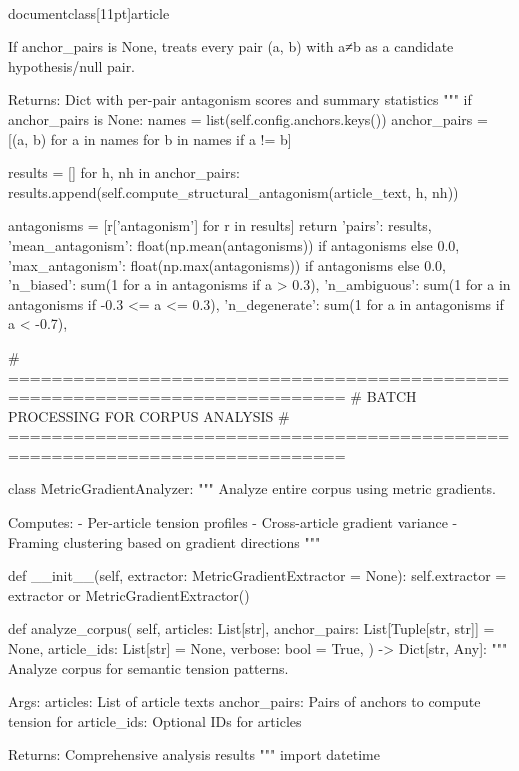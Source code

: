 \\documentclass[11pt]{article}
\begin{document}
\begin{CodeBlock}
        If anchor_pairs is None, treats every pair (a, b) with a≠b as
        a candidate hypothesis/null pair.

        Returns:
            Dict with per-pair antagonism scores and summary statistics
        """
        if anchor_pairs is None:
            names = list(self.config.anchors.keys())
            anchor_pairs = [(a, b) for a in names for b in names if a != b]

        results = []
        for h, nh in anchor_pairs:
            results.append(self.compute_structural_antagonism(article_text, h, nh))

        antagonisms = [r['antagonism'] for r in results]
        return {
            'pairs': results,
            'mean_antagonism': float(np.mean(antagonisms)) if antagonisms else 0.0,
            'max_antagonism': float(np.max(antagonisms)) if antagonisms else 0.0,
            'n_biased': sum(1 for a in antagonisms if a > 0.3),
            'n_ambiguous': sum(1 for a in antagonisms if -0.3 <= a <= 0.3),
            'n_degenerate': sum(1 for a in antagonisms if a < -0.7),
        }


# =============================================================================
# BATCH PROCESSING FOR CORPUS ANALYSIS
# =============================================================================

class MetricGradientAnalyzer:
    """
    Analyze entire corpus using metric gradients.
    
    Computes:
    - Per-article tension profiles
    - Cross-article gradient variance
    - Framing clustering based on gradient directions
    """
    
    def __init__(self, extractor: MetricGradientExtractor = None):
        self.extractor = extractor or MetricGradientExtractor()
    
    def analyze_corpus(
        self,
        articles: List[str],
        anchor_pairs: List[Tuple[str, str]] = None,
        article_ids: List[str] = None,
        verbose: bool = True,
    ) -> Dict[str, Any]:
        """
        Analyze corpus for semantic tension patterns.
        
        Args:
            articles: List of article texts
            anchor_pairs: Pairs of anchors to compute tension for
            article_ids: Optional IDs for articles
            
        Returns:
            Comprehensive analysis results
        """
        import datetime
        

\end{CodeBlock}
\end{document}
